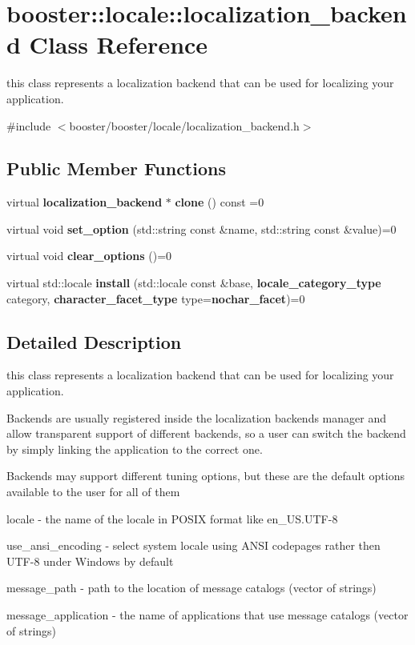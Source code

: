\section{booster\+:\+:locale\+:\+:localization\+\_\+backend Class Reference}
\label{classbooster_1_1locale_1_1localization__backend}


this class represents a localization backend that can be used for localizing your application.  




{\ttfamily \#include $<$booster/booster/locale/localization\+\_\+backend.\+h$>$}

\subsection*{Public Member Functions}
\begin{DoxyCompactItemize}
\item 
virtual {\bf localization\+\_\+backend} $\ast$ {\bf clone} () const =0
\item 
virtual void {\bf set\+\_\+option} (std\+::string const \&name, std\+::string const \&value)=0
\item 
virtual void {\bf clear\+\_\+options} ()=0
\item 
virtual std\+::locale {\bf install} (std\+::locale const \&base, {\bf locale\+\_\+category\+\_\+type} category, {\bf character\+\_\+facet\+\_\+type} type={\bf nochar\+\_\+facet})=0
\end{DoxyCompactItemize}


\subsection{Detailed Description}
this class represents a localization backend that can be used for localizing your application. 

Backends are usually registered inside the localization backends manager and allow transparent support of different backends, so a user can switch the backend by simply linking the application to the correct one.

Backends may support different tuning options, but these are the default options available to the user for all of them


\begin{DoxyEnumerate}
\item {\ttfamily locale} -\/ the name of the locale in P\+O\+S\+IX format like en\+\_\+\+U\+S.\+U\+TF-\/8
\item {\ttfamily use\+\_\+ansi\+\_\+encoding} -\/ select system locale using A\+N\+SI codepages rather then U\+T\+F-\/8 under Windows by default
\item {\ttfamily message\+\_\+path} -\/ path to the location of message catalogs (vector of strings)
\item {\ttfamily message\+\_\+application} -\/ the name of applications that use message catalogs (vector of strings)
\end{DoxyEnumerate}

